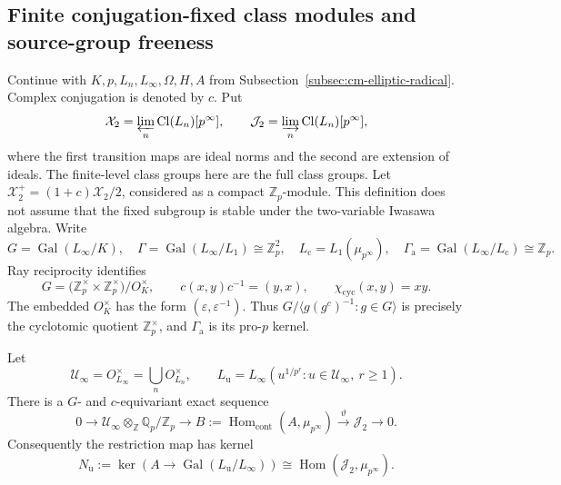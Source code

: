 \subsection{Finite conjugation-fixed class modules and source-group freeness}
\label{subsec:cm-finite-plus}

Continue with \(K,p,L_n,L_\infty,\Omega,H,A\) from
Subsection~\ref{subsec:cm-elliptic-radical}.
Complex conjugation is denoted by \(c\).
Put
\[
 \mathcal X_2=\varprojlim_n\operatorname{Cl}(L_n)[p^\infty],
 \qquad
 \mathcal J_2=\varinjlim_n\operatorname{Cl}(L_n)[p^\infty],
\]
where the first transition maps are ideal norms and the second
are extension of ideals.
The finite-level class groups here are the full class groups.
Let \(\mathcal X_2^+=(1+c)\mathcal X_2/2\), considered as a compact
\(\mathbb Z_p\)-module.
This definition does not assume that the fixed subgroup is stable
under the two-variable Iwasawa algebra.
Write
\[
 G=\operatorname{Gal}(L_\infty/K),\quad
 \Gamma=\operatorname{Gal}(L_\infty/L_1)\cong\mathbb Z_p^2,\quad
 L_{\mathrm c}=L_1(\mu_{p^\infty}),\quad
 \Gamma_{\mathrm a}=\operatorname{Gal}(L_\infty/L_{\mathrm c})
                   \cong\mathbb Z_p .
\]
Ray reciprocity identifies
\[
 G=\bigl(\mathbb Z_p^\times\times\mathbb Z_p^\times\bigr)/O_K^\times,
 \qquad
 c(x,y)c^{-1}=(y,x),\qquad
 \chi_{\mathrm{cyc}}(x,y)=xy.
\]
The embedded \(O_K^\times\) has the form
\((\varepsilon,\varepsilon^{-1})\).
Thus \(G/\langle g(g^c)^{-1}:g\in G\rangle\) is precisely the
cyclotomic quotient \(\mathbb Z_p^\times\), and
\(\Gamma_{\mathrm a}\) is its pro-\(p\) kernel.

\begin{lemma}\label{lem:cm-full-class-kummer}
Let
\[
 \mathcal U_\infty=O_{L_\infty}^{\times}
       =\bigcup_n O_{L_n}^{\times},\qquad
 L_{\mathrm u}=L_\infty(u^{1/p^r}:
                         u\in\mathcal U_\infty,\ r\geq1).
\]
There is a \(G\)- and \(c\)-equivariant exact sequence
\begin{equation}\label{eq:cm-full-class-kummer}
 0\longrightarrow
 \mathcal U_\infty\otimes_{\mathbb Z}\mathbb Q_p/\mathbb Z_p
 \longrightarrow
 B:=\operatorname{Hom}_{\mathrm{cont}}(A,\mu_{p^\infty})
 \xrightarrow{\vartheta}\mathcal J_2
 \longrightarrow0 .
\end{equation}
Consequently the restriction map has kernel
\begin{equation}\label{eq:cm-unit-annihilator}
 N_{\mathrm u}:=
 \ker\!\left(A\longrightarrow
            \operatorname{Gal}(L_{\mathrm u}/L_\infty)\right)
 \cong\operatorname{Hom}(\mathcal J_2,\mu_{p^\infty}).
\end{equation}
\end{lemma}

